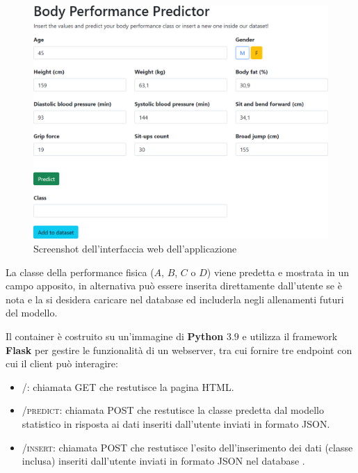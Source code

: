 \documentclass[12pt,a4paper]{report}
\begin{document}
\begin{figure}[H]
  \includegraphics[width=\textwidth]{interfaccia}
  \centering
  \caption{Screenshot dell'interfaccia web dell'applicazione}
\end{figure}

La classe della performance fisica ($A$, $B$, $C$ o $D$) viene predetta
e mostrata in un campo apposito, in alternativa può essere inserita
direttamente dall'utente se è nota e la si desidera caricare
nel database ed includerla negli allenamenti futuri del modello.

Il container è costruito su un'immagine di \textbf{Python} $3.9$
e utilizza il framework \textbf{Flask} per gestire le funzionalità
di un webserver, tra cui fornire tre endpoint con
cui il client può interagire:
\begin{itemize}
  \item \textsc{/}: chiamata GET che restutisce la pagina HTML.
  \item \textsc{/predict}: chiamata POST che restutisce la classe predetta dal modello statistico in risposta ai dati inseriti dall'utente inviati in formato JSON.
  \item \textsc{/insert}: chiamata POST che restutisce l'esito dell'inserimento dei dati (classe inclusa) inseriti dall'utente inviati in formato JSON nel database .
\end{itemize}
\end{document}
